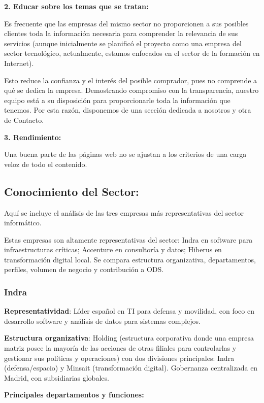 \documentclass[11.5pt]{article}
\begin{document}
	\textbf{2. Educar sobre los temas que se tratan:}
	
	Es frecuente que las empresas del mismo sector no proporcionen a sus posibles clientes toda la información necesaria para comprender la relevancia de sus servicios (aunque inicialmente se planificó el proyecto como una empresa del sector tecnológico, actualmente, estamos enfocados en el sector de la formación en Internet).
	
	Esto reduce la confianza y el interés del posible comprador, pues no comprende a qué se dedica la empresa. Demostrando compromiso con la transparencia, nuestro equipo está a su disposición para proporcionarle toda la información que tenemos. Por esta razón, disponemos de una sección dedicada a nosotros y otra de Contacto.
	
	\textbf{3. Rendimiento:}
	
	Una buena parte de las páginas web no se ajustan a los criterios de una carga veloz de todo el contenido.
	
	\subsection{Conocimiento del Sector:}
	Aquí se incluye el análisis de las tres empresas más representativas del sector informático.
	
	Estas empresas son altamente representativas del sector: Indra en software para infraestructuras críticas;
	Accenture en consultoría y datos; Hiberus en transformación digital local. Se compara estructura organizativa,
	departamentos, perfiles, volumen de negocio y contribución a ODS.
	
	\subsubsection{Indra}
	
	\textbf{Representatividad}: Líder español en TI para defensa y movilidad, con foco en desarrollo software y análisis
	de datos para sistemas complejos.
	
	\textbf{Estructura organizativa}: Holding (estructura corporativa donde una empresa matriz posee la mayoría de las acciones de otras filiales para controlarlas y gestionar sus políticas y operaciones) con dos divisiones principales: Indra (defensa/espacio) y Minsait (transformación digital). Gobernanza centralizada en Madrid, con subsidiarias globales.
	
	\textbf{Principales departamentos y funciones:}
	
\end{document}
